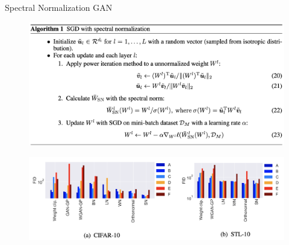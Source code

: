 \begin{frame}{Spectral Normalization GAN}
	\begin{figure}
		\centering
		\includegraphics[width=0.85\linewidth]{figs/sngan_pseudocode}
	\end{figure}
	\begin{figure}
		\centering
		\includegraphics[width=0.85\linewidth]{figs/sngan_fids}
	\end{figure}
	
\end{frame}
